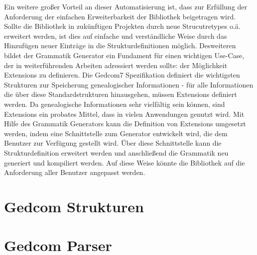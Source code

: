 Ein weitere großer Vorteil an dieser Automatisierung ist, dass zur Erfüllung der Anforderung der einfachen Erweiterbarkeit der Bibliothek beigetragen wird. Sollte die Bibliothek in zukünftigen Projekten durch neue Strucutretypes o.ä. erweitert werden, ist dies auf einfache und verständliche Weise durch das Hinzufügen neuer Einträge in die Strukturdefinitionen möglich. Desweiteren bildet der Grammatik Generator ein Fundament für einen wichtigen Use-Case, der in weiterführenden Arbeiten adressiert werden sollte: der Möglichkeit Extensions zu definieren. Die Gedcom7 Spezifikation definiert die wichtigsten Strukturen zur Speicherung genealogischer Informationen - für alle Informationen die über diese Standardstrukturen hinausgehen, müssen Extensions definiert werden. Da genealogische Informationen sehr vielfältig sein können, sind Extensions ein probates Mittel, dass in vielen Anwendungen genutzt wird. Mit Hilfe des Grammatik Generators kann die Definition von Extensions umgesetzt werden, indem eine Schnittstelle zum Generator entwickelt wird, die dem Benutzer zur Verfügung gestellt wird. Über diese Schnittstelle kann die Strukturdefinition erweitert werden und anschließend die Grammatik neu generiert und kompiliert werden. Auf diese Weise könnte die Bibliothek auf die Anforderung aller Benutzer angepasst werden. 
\section{Gedcom Strukturen}
\label{sec: Konzept - Gedcom Strukturen}


\section{Gedcom Parser}
\label{sec: Konzept - Gedcom Parser}

